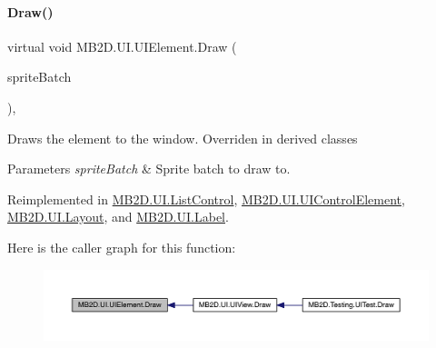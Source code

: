 \paragraph{\texorpdfstring{Draw()}{Draw()}}
{\footnotesize\ttfamily virtual void M\+B2\+D.\+U\+I.\+U\+I\+Element.\+Draw (\begin{DoxyParamCaption}\item[{Sprite\+Batch}]{sprite\+Batch }\end{DoxyParamCaption})\hspace{0.3cm}{\ttfamily [inline]}, {\ttfamily [virtual]}}



Draws the element to the window. Overriden in derived classes 


\begin{DoxyParams}{Parameters}
{\em sprite\+Batch} & Sprite batch to draw to.\\
\hline
\end{DoxyParams}


Reimplemented in \hyperlink{class_m_b2_d_1_1_u_i_1_1_list_control_a2ec92a77d8960945f3bd37bd76641946}{M\+B2\+D.\+U\+I.\+List\+Control}, \hyperlink{class_m_b2_d_1_1_u_i_1_1_u_i_control_element_afac0cbbbbead7c7348401075cda433ba}{M\+B2\+D.\+U\+I.\+U\+I\+Control\+Element}, \hyperlink{class_m_b2_d_1_1_u_i_1_1_layout_ae018eee922839254b46610216843afa7}{M\+B2\+D.\+U\+I.\+Layout}, and \hyperlink{class_m_b2_d_1_1_u_i_1_1_label_a976ec212cedf0710fb35cd578e1e51b1}{M\+B2\+D.\+U\+I.\+Label}.

Here is the caller graph for this function\+:
\nopagebreak
\begin{figure}[H]
\begin{center}
\leavevmode
\includegraphics[width=350pt]{class_m_b2_d_1_1_u_i_1_1_u_i_element_afec98e6e38cb0dbc17a5db6d6a3d5ba5_icgraph}
\end{center}
\end{figure}
\hypertarget{class_m_b2_d_1_1_u_i_1_1_u_i_element_a0a17b121a60ad05039f01eee006ae76c}{}\label{class_m_b2_d_1_1_u_i_1_1_u_i_element_a0a17b121a60ad05039f01eee006ae76c} 
